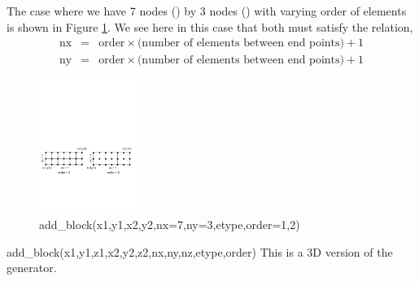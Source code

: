 \begin{codelist}
    The case where we have 7 nodes () by 3 nodes () 
    with varying order of elements is shown in Figure \ref{fig:AddBlock2D}.
    We see here in this case that  both must satisfy the relation,
    \begin{eqnarray}
      \text{nx} &=& \text{order} \times
                    \text{(number of elements between end points)}
                    + 1 \nonumber \\
      \text{ny} &=& \text{order} \times
                    \text{(number of elements between end points)}
                    + 1 \nonumber
    \end{eqnarray}
    \begin{figure}[htbp]
    \centering
    \includegraphics[trim=0.0in 3.0in 0.5in 5.3in, clip, height=1.7in]{fig/add_blocks2d.pdf}
    \caption{add\_block(x1,y1,x2,y2,nx=7,ny=3,etype,order=1,2)}
    \label{fig:AddBlock2D}
    \end{figure}

  \item[add\_block(x1,y1,z1,x2,y2,z2,nx,ny,nz,etype,order)]
    This is a 3D version of the  generator. 
\end{codelist}

\clearpage
